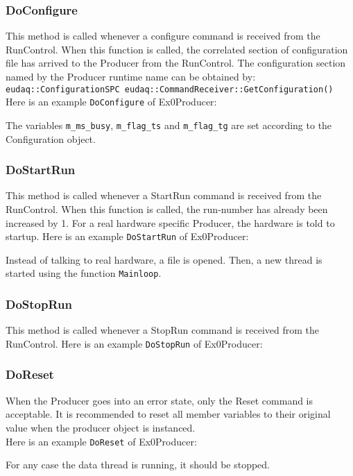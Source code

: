 \subsubsection{DoConfigure}
This method is called whenever a configure command is received from the RunControl. When this function is called, the correlated section of configuration file has arrived to the Producer from the RunControl. The configuration section named by the Producer runtime name can be obtained by:\\
\lstinline[style=cpp]{eudaq::ConfigurationSPC eudaq::CommandReceiver::GetConfiguration()} \\

Here is an example \lstinline[style=cpp]{DoConfigure} of Ex0Producer:

The variables \lstinline[style=cpp]{m_ms_busy}, \lstinline[style=cpp]{m_flag_ts} and \lstinline[style=cpp]{m_flag_tg} are set according to the Configuration object.

\subsubsection{DoStartRun}\label{sec:ex0prdstart}
This method is called whenever a StartRun command is received from the RunControl. When this function is called, the run-number has already been increased by 1. For a real hardware specific Producer, the hardware is told to startup.
Here is an example \lstinline[style=cpp]{DoStartRun} of Ex0Producer:

Instead of talking to real hardware, a file is opened. Then, a new thread is started using the function \lstinline[style=cpp]{Mainloop}.

\subsubsection{DoStopRun}
This method is called whenever a StopRun command is received from the RunControl. Here is an example \lstinline[style=cpp]{DoStopRun} of Ex0Producer:


\subsubsection{DoReset}
When the Producer goes into an error state, only the Reset command is acceptable. It is recommended to reset all member variables to their original value when the producer object is instanced.\\
Here is an example \lstinline[style=cpp]{DoReset} of Ex0Producer: 

For any case the data thread is running, it should be stopped.

